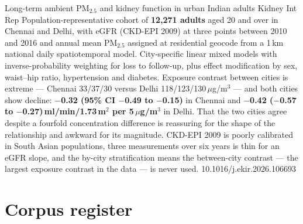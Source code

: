 \documentclass[10pt]{article}
\begin{document}

{Long-term ambient PM$_{2.5}$ and kidney function in urban Indian adults}
{Kidney Int Rep}
{Population-representative cohort of \textbf{12{,}271 adults} aged 20 and over in Chennai and
Delhi, with eGFR (CKD-EPI 2009) at three points between 2010 and 2016 and annual mean
PM$_{2.5}$ assigned at residential geocode from a 1\,km national daily spatiotemporal model.
City-specific linear mixed models with inverse-probability weighting for loss to follow-up,
plus effect modification by sex, waist--hip ratio, hypertension and diabetes. Exposure
contrast between cities is extreme --- Chennai 33/37/30 versus Delhi 118/123/130\,$\mu$g/m$^3$
--- and both cities show decline: \textbf{$-$0.32 (95\% CI $-$0.49 to $-$0.15)} in Chennai and
\textbf{$-$0.42 ($-$0.57 to $-$0.27)\,ml/min/1.73\,m$^2$ per 5\,$\mu$g/m$^3$} in Delhi. That
the two cities agree despite a fourfold concentration difference is reassuring for the shape
of the relationship and awkward for its magnitude. CKD-EPI 2009 is poorly calibrated in South
Asian populations, three measurements over six years is thin for an eGFR slope, and the
by-city stratification means the between-city contrast --- the largest exposure contrast in the
data --- is never used.}
{10.1016/j.ekir.2026.106693}

\clearpage

\section*{\sffamily\bfseries\color{Deep}Corpus register}
\vspace{-1.5mm}{\color{Amber}\rule{\linewidth}{1.1pt}}\vspace{2.5mm}


\end{document}

